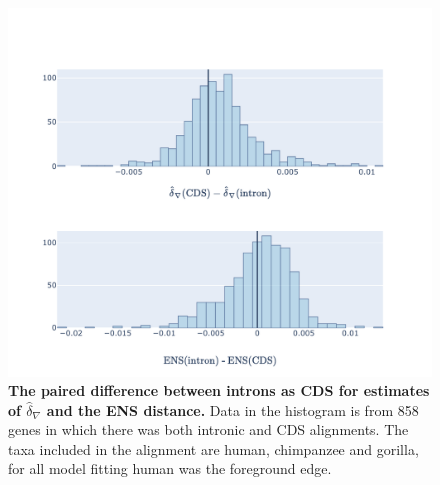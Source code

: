 \begin{figure}[htbp]
\centering
\includegraphics[width=\textwidth]{figures/plots/primate/d-conv-diff.pdf}
\caption{\textbf{The paired difference between introns as CDS for estimates of $\hat\delta_\nabla$ and the ENS distance.} Data in the histogram is from 858 genes in which there was both intronic and CDS alignments. The taxa included in the alignment are human, chimpanzee and gorilla, for all model fitting human was the foreground edge.}
\label{fig:primate:dconv-diff}
\end{figure}
